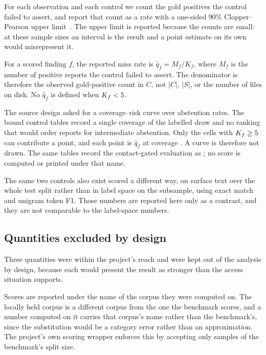 For each observation and each control we count the gold positives the control
failed to assert, and report that count as a rate with a one-sided \(90\%\)
Clopper--Pearson upper limit~\cite{clopper1934use}. The upper limit is reported
because the counts are small: at these sample sizes an interval is the result and
a point estimate on its own would misrepresent it.

For a scored finding \(f\), the reported miss rate is
\(\widehat q_f=M_f/K_f\), where \(M_f\) is the number of positive reports the
control failed to assert. The denominator is therefore the observed
gold-positive count in \(C\), not \(|C|\), \(|S|\), or the number of files on
disk. No \(\widehat q_f\) is defined when \(K_f<5{}\).

The source design asked for a coverage--risk curve over abstention rates.
The bound control tables record a single coverage of the labelled draw and
no ranking that would order reports for intermediate abstention. Only the
\NCoverageRiskPoints{} cells with \(K_f\geq5{}\) can contribute a
point, and each point is \(\widehat q_f\) at coverage
\CoverageRiskCoverage{}. A curve is therefore not drawn. The same tables
record the contact-gated evaluation as \TypeRBound{}; no score is computed
or printed under that name.

The same two controls also exist scored a different way, on surface text over the
whole test split rather than in label space on the subsample, using exact match
and unigram token F1. Those numbers are reported here only as a contrast, and
they are not comparable to the label-space numbers.

\subsection{Quantities excluded by design}

Three quantities were within the project's reach and were kept out of the
analysis by design, because each would present the result as stronger than
the access situation supports.

Scores are reported under the name of the corpus they were computed on. The
locally held corpus is a different corpus from the one the benchmark scores,
and a number computed on it carries that corpus's name rather than the
benchmark's, since the substitution would be a category error rather than an
approximation. The project's own scoring wrapper enforces this by accepting
only samples of the benchmark's split size.

